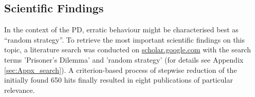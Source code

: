 \documentclass[11pt]{article}
\begin{document}
%
%
%
%

\subsection{Scientific Findings} \label{sec:scientific_findings}
In the context of the PD, erratic behaviour might be characterised best as “random strategy”.
To retrieve the most important scientific findings on this topic, a literature search was conducted on \url{scholar.google.com} with the search terms 'Prisoner's Dilemma' and 'random strategy' (for details see Appendix \ref{sec:Appx_search}).
A criterion-based process of stepwise reduction of the initially found 650 hits finally resulted in eight publications of particular relevance.
\end{document}
